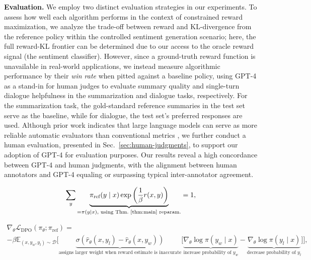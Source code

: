 \textbf{Evaluation.} We employ two distinct evaluation strategies in our experiments. To assess how well each algorithm performs in the context of constrained reward maximization, we analyze the trade-off between reward and KL-divergence from the reference policy within the controlled sentiment generation scenario; here, the full reward-KL frontier can be determined due to our access to the oracle reward signal (the sentiment classifier). However, since a ground-truth reward function is unavailable in real-world applications, we instead measure algorithmic performance by their \textit{win rate} when pitted against a baseline policy, using GPT-4 as a stand-in for human judges to evaluate summary quality and single-turn dialogue helpfulness in the summarization and dialogue tasks, respectively. For the summarization task, the gold-standard reference summaries in the test set serve as the baseline, while for dialogue, the test set’s preferred responses are used. Although prior work indicates that large language models can serve as more reliable automatic evaluators than conventional metrics \citep{Chen2023ExploringTU}, we further conduct a human evaluation, presented in Sec.~\ref{sec:human-judgments}, to support our adoption of GPT-4 for evaluation purposes. Our results reveal a high concordance between GPT-4 and human judgments, with the alignment between human annotators and GPT-4 equaling or surpassing typical inter-annotator agreement.

\begin{equation}\label{eq:lag_p}
     \sum_{y}\underbrace{\pi_\text{ref}(y\mid x)\exp\left(\frac{1}{\beta}r(x, y)\right)}_{=\pi(y\mid x)\text{, using Thm.~\ref{thm:main} reparam.}} = 1,
\end{equation}

\begin{multline*}\label{eq:gradient}
    \nabla_\theta \mathcal{L}_\text{DPO}(\pi_\theta;\pi_\text{ref}) = \\ -\beta\mathbb{E}_{(x, y_w, y_l) \sim \mathcal{D}} \bigg[\underbrace{\sigma(\hat{r}_\theta(x, y_l) - \hat{r}_\theta (x, y_w))}_\text{assigns larger weight when reward estimate is inaccurate}\bigg[\underbrace{\nabla_\theta\log \pi(y_w \mid x)}_\text{increase probability of $y_w$} - \underbrace{\nabla_\theta\log\pi(y_l \mid x)}_\text{decrease probability of $y_l$}\bigg]\bigg],
\end{multline*}

